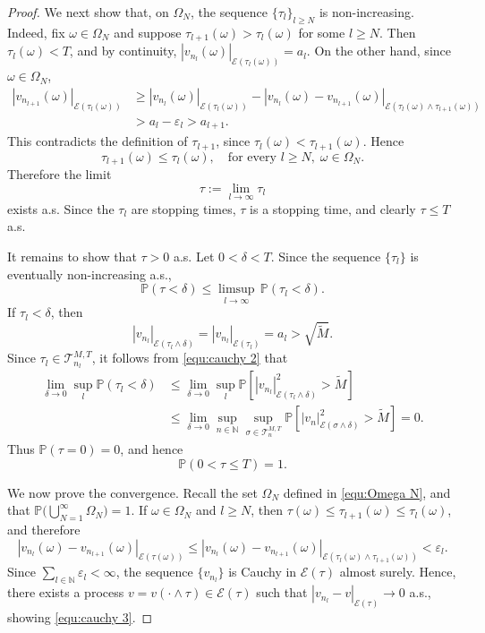 \documentclass[11pt, reqno]{amsart}
\theoremstyle{definition}
\numberwithin{equation}{section}
\newcommand{\bb}{\mathbb}
\newcommand{\abs}[1]{\left|{#1}\right|}
\begin{document}
\begin{proof}
	We next show that, on $\Omega_N$, the sequence $\{\tau_l\}_{l\geq N}$ is
	non-increasing. Indeed, fix $\omega\in\Omega_N$ and suppose
	$\tau_{l+1}(\omega)>\tau_l(\omega)$ for some $l\geq N$. Then
	$\tau_l(\omega)<T$, and by continuity, $\abs{v_{n_l}(\omega)}_{\mathcal E(\tau_l(\omega))}=a_l$.
	On the other hand, since $\omega\in\Omega_N$,
	\[
	\begin{aligned}
		\abs{v_{n_{l+1}}(\omega)}_{\mathcal E(\tau_l(\omega))}
		&\geq
		\abs{v_{n_l}(\omega)}_{\mathcal E(\tau_l(\omega))}
		-
		\abs{v_{n_l}(\omega)-v_{n_{l+1}}(\omega)}
		_{\mathcal E(\tau_l(\omega)\wedge\tau_{l+1}(\omega))}
		\\
		&>
		a_l-\varepsilon_l
		>
		a_{l+1}.
	\end{aligned}
	\]
	This contradicts the definition of $\tau_{l+1}$, since
	$\tau_l(\omega)<\tau_{l+1}(\omega)$. Hence
	\[
	\tau_{l+1}(\omega)\leq \tau_l(\omega),
	\quad \text{for every } l\geq N,\; \omega\in\Omega_N .
	\]
	Therefore the limit
	\[
	\tau:=\lim_{l\to\infty}\tau_l
	\]
	exists a.s. Since the $\tau_l$ are stopping times, $\tau$ is a stopping
	time, and clearly $\tau\leq T$ a.s.
	
	It remains to show that $\tau>0$ a.s. Let $0<\delta<T$. Since the
	sequence $\{\tau_l\}$ is eventually non-increasing a.s.,
	\[
	\mathbb P(\tau<\delta)
	\leq
	\limsup_{l\to\infty}\,\mathbb P(\tau_l<\delta).
	\]
	If $\tau_l<\delta$, then
	\[
	\abs{v_{n_l}}_{\mathcal E(\tau_l\wedge\delta)}
	=
	\abs{v_{n_l}}_{\mathcal E(\tau_l)}
	=
	a_l
	>
	\sqrt{\widetilde M}.
	\]
	Since $\tau_l\in\mathcal T_{n_l}^{M,T}$, it follows from
	\eqref{equ:cauchy 2} that
	\[
	\begin{aligned}
		\lim_{\delta\to0}
		\sup_l\mathbb P(\tau_l<\delta)
		&\leq
		\lim_{\delta\to0}
		\sup_l
		\mathbb P\left[
		\abs{v_{n_l}}_{\mathcal E(\tau_l\wedge\delta)}^2
		>
		\widetilde M
		\right]
		\\
		&\leq
		\lim_{\delta\to0}
		\sup_{n\in\mathbb N}
		\sup_{\sigma\in\mathcal T_n^{M,T}}
		\mathbb P\left[
		\abs{v_n}_{\mathcal E(\sigma\wedge\delta)}^2
		>
		\widetilde M
		\right]
		=0.
	\end{aligned}
	\]
	Thus $\mathbb P(\tau=0)=0$, and hence
	\[
	\mathbb P(0<\tau\leq T)=1.
	\]
	
	We now prove the convergence. Recall the set $\Omega_N$ defined in \eqref{equ:Omega N}, and that $\mathbb P\big(\bigcup_{N=1}^{\infty}\Omega_N\big)=1$. If $\omega\in\Omega_N$ and $l\geq N$, then
	$\tau(\omega)\leq \tau_{l+1}(\omega)\leq\tau_l(\omega)$, and therefore
	\[
		\abs{v_{n_l}(\omega)-v_{n_{l+1}}(\omega)}_{\mathcal E(\tau(\omega))}
		\leq
		\abs{v_{n_l}(\omega)-v_{n_{l+1}}(\omega)}
		_{\mathcal E(\tau_l(\omega)\wedge\tau_{l+1}(\omega))}
		<
		\varepsilon_l.
	\]
	Since $\sum_{l\in \bb{N}} \varepsilon_l<\infty$, the sequence $\{v_{n_l}\}$ is Cauchy
	in $\mathcal E(\tau)$ almost surely. Hence, there exists a process
	$v=v(\cdot\wedge\tau)\in\mathcal E(\tau)$ such that $\abs{v_{n_l}-v}_{\mathcal E(\tau)}\to 0$ a.s., showing \eqref{equ:cauchy 3}.
	

\end{proof}
\end{document}
